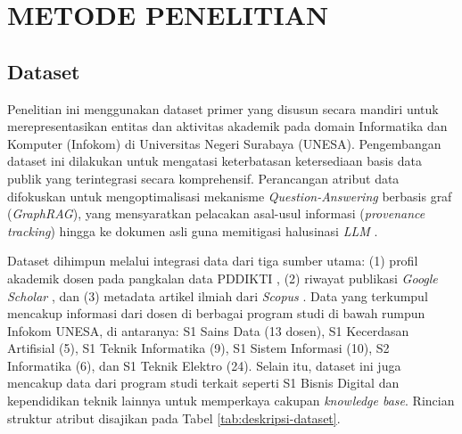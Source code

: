 \chapter{METODE PENELITIAN}

\section{Dataset}

Penelitian ini menggunakan dataset primer yang disusun secara mandiri untuk merepresentasikan entitas dan aktivitas akademik pada domain Informatika dan Komputer (Infokom) di Universitas Negeri Surabaya (UNESA). Pengembangan dataset ini dilakukan untuk mengatasi keterbatasan ketersediaan basis data publik yang terintegrasi secara komprehensif. Perancangan atribut data difokuskan untuk mengoptimalisasi mekanisme \textit{Question-Answering} berbasis graf (\textit{GraphRAG}), yang mensyaratkan pelacakan asal-usul informasi (\textit{provenance tracking}) hingga ke dokumen asli guna memitigasi halusinasi \textit{LLM} \cite{kim2026medsumgraph}.

Dataset dihimpun melalui integrasi data dari tiga sumber utama: (1) profil akademik dosen pada pangkalan data PDDIKTI \citep{pddikti_db}, (2) riwayat publikasi \textit{Google Scholar} \citep{google_scholar}, dan (3) metadata artikel ilmiah dari \textit{Scopus} \citep{scopus_db}. Data yang terkumpul mencakup informasi dari dosen di berbagai program studi di bawah rumpun Infokom UNESA, di antaranya: S1 Sains Data (13 dosen), S1 Kecerdasan Artifisial (5), S1 Teknik Informatika (9), S1 Sistem Informasi (10), S2 Informatika (6), dan S1 Teknik Elektro (24). Selain itu, dataset ini juga mencakup data dari program studi terkait seperti S1 Bisnis Digital dan kependidikan teknik lainnya untuk memperkaya cakupan \textit{knowledge base}. Rincian struktur atribut disajikan pada Tabel \ref{tab:deskripsi-dataset}.

